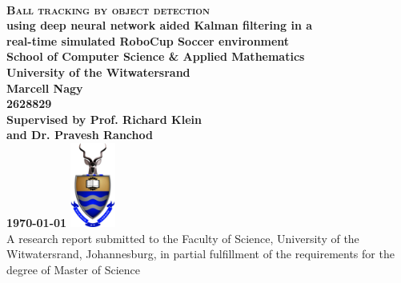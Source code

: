 \documentclass[a4paper,twoside,12pt]{report}
\begin{document}
\onecolumn
\thispagestyle{empty}

\setcounter{page}{0}
\ 
\begin{center}
  \vfill
  {
  \huge \bf \textsc{Ball tracking by object detection}\\
  \large using deep neural network aided Kalman filtering in a\\
  \large real-time simulated RoboCup Soccer environment\\[20pt]
  \large School of Computer Science \& Applied Mathematics\\
  \large University of the Witwatersrand\\[20pt]
  \normalsize
  Marcell Nagy\\
  2628829\\[20pt]
  Supervised by Prof. Richard Klein \\
  and Dr. Pravesh Ranchod\\[10pt]
  \today
  }
  \vfill
  \vfill
  \includegraphics[width=1.5cm]{images/wits}
  \vspace{10pt}\\
  \small{A research report submitted to the Faculty of Science, University of the Witwatersrand, Johannesburg,
in partial fulfillment of the requirements for the degree of Master of Science}\\
\end{center}
\vfill

\newpage
\pagestyle{plain}
\setcounter{page}{1}
\end{document}
